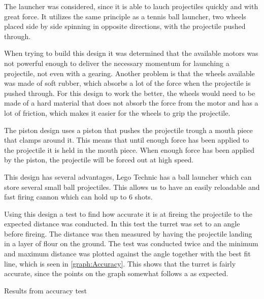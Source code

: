 The launcher was considered, since it is able to lauch projectiles quickly and
with great force. It utilizes the same principle as a tennis ball launcher, two
wheels placed side by side spinning in opposite directions, with the projectile
pushed through.


When trying to build this design it was determined that the available motors was
not powerful enough to deliver the necessary momentum for launching a
projectile, not even with a gearing. Another problem is that the wheels
available was made of soft rubber, which absorbs a lot of the force when the
projectile is pushed through. For this design to work the better, the wheels
would need to be made of a hard material that does not absorb the force from the
motor and has a lot of friction, which makes it easier for the wheels to
grip the projectile.\nl

The piston design uses a piston that pushes the projectile trough a mouth piece
that clamps around it. This means that until enough force has been applied to
the projectile it is held in the mouth piece. When enough force has been
applied by the piston, the projectile will be forced out at high speed.


This design has several advantages, Lego Technic has a ball launcher which can
store several small ball projectiles. This allows us to have an easily
reloadable and fast firing cannon which can hold up to 6 shots.\nl

Using this design a test to find how accurate it is at fireing the projectile
to the expected distance was conducted.
In this test the turret was set to an angle before fireing. The distance was
then measured by having the projectile landing in a layer of flour on the
ground. The test was conducted twice and the minimum and maximum distance was
plotted against the angle together with the best fit line, which is seen in
\autoref{graph:Accuracy}.
This shows that the turret is fairly accurate, since the points on
the graph somewhat follows a  as
expected.


\begin{graphEnv}
\begin{graphFloat}
\centering
{}
\caption{Results from accuracy test}
\end{graphFloat}
\label{graph:Accuracy}
\end{graphEnv}


